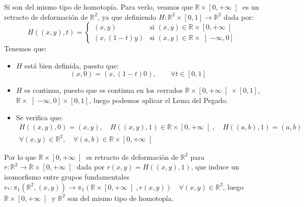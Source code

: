 \begin{ejercicio}
        \noindent
        Sí son del mismo tipo de homotopía. Para verlo, veamos que $\mathbb{R}\times \left[0,+\infty\right[$ es un retracto de deformación de $\mathbb{R}^2$, ya que definiendo $H:\mathbb{R}^2\times [0,1]\to \mathbb{R}^2$ dada por:
            \begin{equation*}
                H((x,y),t) = \left\{\begin{array}{ll}
                        (x,y) & \text{si\ } (x,y)\in \mathbb{R}\times \left[0,+\infty\right[ \\
                        (x, (1-t)y) & \text{si\ } (x,y)\in \mathbb{R}\times \left]-\infty, 0\right]
                \end{array}\right. 
            \end{equation*}
            Tenemos que:
            \begin{itemize}
                \item $H$ está bien definida, puesto que:
                    \begin{equation*}
                        (x,0) = (x,(1-t)0), \qquad \forall t\in [0,1]
                    \end{equation*}
                \item $H$ es continua, puesto que es continua en los cerrados $\mathbb{R}\times \left[0,+\infty\right[\times [0,1]$, $\mathbb{R}\times \left]-\infty,0\right]\times [0,1]$, luego podemos aplicar el Lema del Pegado.
                \item Se verifica que:
                    \begin{multline*}
                        H((x,y),0) = (x,y), \quad H((x,y),1) \in \mathbb{R}\times \left[0,+\infty\right[, \quad H((a,b),1) = (a,b) \\
                            \forall (x,y)\in \mathbb{R}^2, \quad \forall (a,b)\in \mathbb{R}\times \left[0,+\infty\right[
                    \end{multline*}
            \end{itemize}
            Por lo que $\mathbb{R}\times \left[0,+\infty\right[$ es retracto de deformación de $\mathbb{R}^2$ para $r:\mathbb{R}^2\to \mathbb{R}\times \left[0,+\infty\right[$ dada por $r(x,y) = H((x,y),1)$, que induce un isomorfismo entre grupos fundamentales $r_\ast:\pi_1(\mathbb{R}^2,(x,y))\to \pi_1(\mathbb{R}\times \left[0,+\infty\right[, r(x,y))\quad \forall (x,y)\in \mathbb{R}^2$, luego $\mathbb{R}\times \left[0,+\infty\right[$ y $\mathbb{R}^2$ son del mismo tipo de homotopía.
\end{ejercicio}


